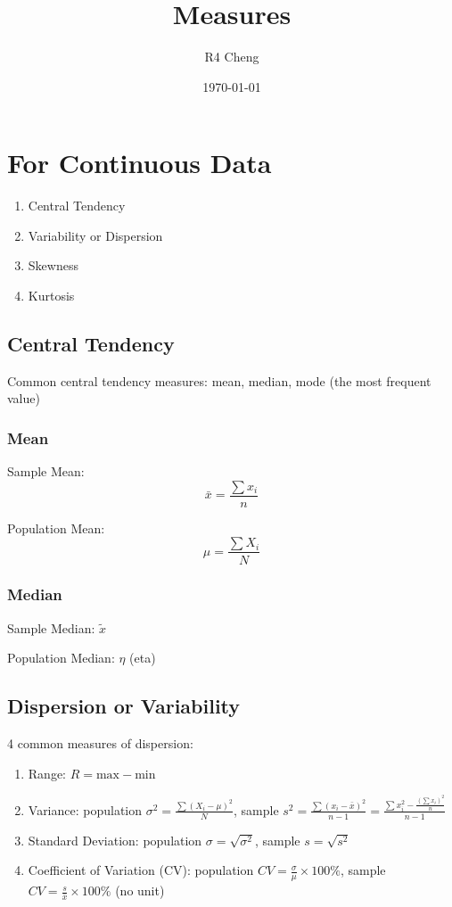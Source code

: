 \documentclass[12pt,a4paper]{article}
\title{Measures}
\author{R4 Cheng}
\date{\today}
\begin{document}
\maketitle

\section*{For Continuous Data}

\begin{enumerate}
    \item Central Tendency
    \item Variability or Dispersion
    \item Skewness
    \item Kurtosis
\end{enumerate}

\subsection*{Central Tendency}

Common central tendency measures: mean, median, mode (the most frequent value)

\subsubsection*{Mean}

Sample Mean:
\[
\bar{x} = \frac{\sum x_i}{n}
\]

Population Mean:
\[
\mu = \frac{\sum X_i}{N}
\]

\subsubsection*{Median}

Sample Median: $\tilde{x}$

Population Median: $\eta$ (eta)

\subsection*{Dispersion or Variability}

4 common measures of dispersion:

\begin{enumerate}
    \item Range: $R = \text{max} - \text{min}$
    \item Variance: population $\sigma^2 = \frac{\sum (X_i - \mu)^2}{N}$, sample $s^2 = \frac{\sum (x_i - \bar{x})^2}{n-1} = \frac{\sum x_i^2 - \frac{(\sum x_i)^2}{n}}{n-1} $
    \item Standard Deviation: population $\sigma = \sqrt{\sigma^2}$, sample $s = \sqrt{s^2}$
    \item Coefficient of Variation (CV): population $CV = \frac{\sigma}{\mu} \times 100\%$, sample $CV = \frac{s}{\bar{x}} \times 100\%$ (no unit)
\end{enumerate}
\end{document}
